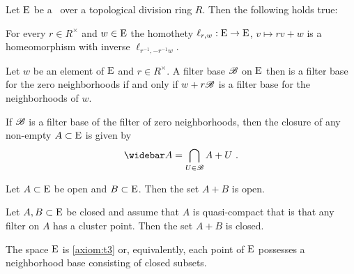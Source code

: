 \begin{proposition}\label{thm:basic-properties-sets-maps-topological-vector-spaces}
  Let $\mathrm{E}$ be a \tvs~over a topological division ring $R$.
  Then the following holds true:
  \begin{romanlist}
  \item\label{ite:translated-homotheties-homeomorphisms}
    For every $r\in R^\times$ and $w\in \mathrm{E}$ the homothety
    $\ell_{r,w} : \mathrm{E} \to \mathrm{E}$, $v\mapsto rv +w$ is a homeomorphism
    with inverse $\ell_{r^{-1},-r^{-1}w}$. 
   \item\label{ite:translated-base}
     Let $w$ be an element of $\mathrm{E}$ and $r\in R^\times$. 
     A filter base $\mathscr{B}$ on $\mathrm{E}$ then is a filter base for the zero
     neighborhoods if and only if  $w + r \mathscr{B}$ is a filter base for the
     neighborhoods of $w$.
   \item\label{ite:closure-terms-base}
     If $\mathscr{B}$ is a filter base of the filter of zero neighborhoods, then 
     the closure of any non-empty $A\subset \mathrm{E}$  is given by
     \[
       \closure{A} =\bigcap\limits_{U \in \base} A + U \ .
     \]
   \item\label{ite:sum-open}
     Let $A\subset \mathrm{E}$ be open and $B\subset \mathrm{E}$. Then the set
     $A+B$ is open.
   \item\label{ite:sum-closed}
     Let $A, B \subset \mathrm{E}$ be closed and assume that $A$ is quasi-compact
     that is that any filter on $A$ has a cluster point.
     Then the set $A+B$ is closed.
   \item
     The space  $\mathrm{E}$ is \ref{axiom:t3} or, equivalently, each point of $\mathrm{E}$ possesses a
     neighborhood base consisting of closed subsets.
  \end{romanlist}   
  \end{proposition}

